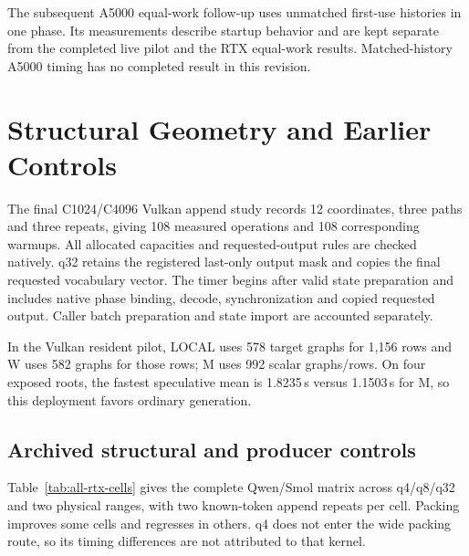 The subsequent A5000 equal-work follow-up uses unmatched first-use histories in one phase. Its measurements describe startup behavior and are kept separate from the completed live pilot and the RTX equal-work results. Matched-history A5000 timing has no completed result in this revision.

\section{Structural Geometry and Earlier Controls}


The final C1024/C4096 Vulkan append study records 12 coordinates, three paths and three repeats, giving 108 measured operations and 108 corresponding warmups. All allocated capacities and requested-output rules are checked natively. q32 retains the registered last-only output mask and copies the final requested vocabulary vector. The timer begins after valid state preparation and includes native phase binding, decode, synchronization and copied requested output. Caller batch preparation and state import are accounted separately.

In the Vulkan resident pilot, LOCAL uses 578 target graphs for 1,156 rows and W uses 582 graphs for those rows; M uses 992 scalar graphs/rows. On four exposed roots, the fastest speculative mean is 1.8235\,s versus 1.1503\,s for M, so this deployment favors ordinary generation.


\subsection{Archived structural and producer controls}
\label{supp:archive}
Table~\ref{tab:all-rtx-cells} gives the complete Qwen/Smol matrix across q4/q8/q32 and two physical ranges, with two known-token append repeats per cell. Packing improves some cells and regresses in others. q4 does not enter the wide packing route, so its timing differences are not attributed to that kernel.

